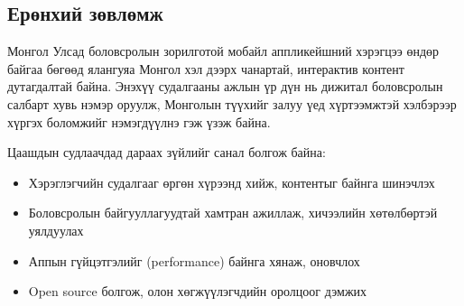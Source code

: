 \subsection{Ерөнхий зөвлөмж}

Монгол Улсад боловсролын зорилготой мобайл аппликейшний хэрэгцээ өндөр байгаа бөгөөд ялангуяа Монгол хэл дээрх чанартай, интерактив контент дутагдалтай байна. Энэхүү судалгааны ажлын үр дүн нь дижитал боловсролын салбарт хувь нэмэр оруулж, Монголын түүхийг залуу үед хүртээмжтэй хэлбэрээр хүргэх боломжийг нэмэгдүүлнэ гэж үзэж байна.

Цаашдын судлаачдад дараах зүйлийг санал болгож байна:
\begin{itemize}
	\item Хэрэглэгчийн судалгааг өргөн хүрээнд хийж, контентыг байнга шинэчлэх
	\item Боловсролын байгууллагуудтай хамтран ажиллаж, хичээлийн хөтөлбөртэй уялдуулах
	\item Аппын гүйцэтгэлийг (performance) байнга хянаж, оновчлох
	\item Open source болгож, олон хөгжүүлэгчдийн оролцоог дэмжих
\end{itemize}
